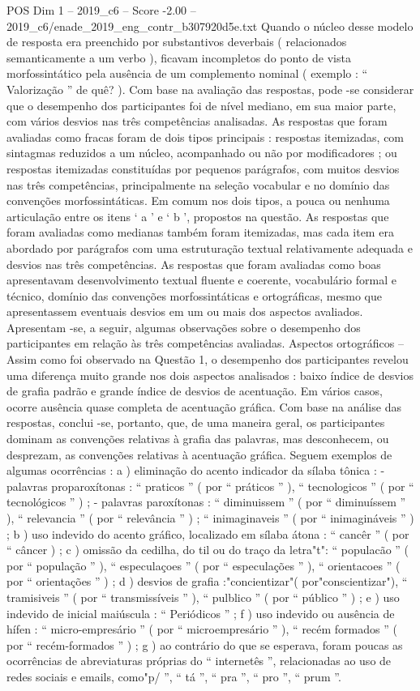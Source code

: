 \begin{textsample}{POS Dim 1 – 2019\_c6 – Score -2.00 – 2019\_c6/enade\_2019\_eng\_contr\_b307920d5e.txt}
Quando o núcleo desse modelo de resposta era preenchido por substantivos deverbais ( relacionados semanticamente a um verbo ), ficavam incompletos do ponto de vista morfossintático pela ausência de um complemento nominal ( exemplo : “ Valorização ” de quê? ).
Com base na avaliação das respostas, pode -se considerar que o desempenho dos participantes foi de nível mediano, em sua maior parte, com vários desvios nas três competências analisadas.
As respostas que foram avaliadas como fracas foram de dois tipos principais : respostas itemizadas, com sintagmas reduzidos a um núcleo, acompanhado ou não por modificadores ; ou respostas itemizadas constituídas por pequenos parágrafos, com muitos desvios nas três competências, principalmente na seleção vocabular e no domínio das convenções morfossintáticas.
Em comum nos dois tipos, a pouca ou nenhuma articulação entre os itens ‘ a ’ e ‘ b ’, propostos na questão.
As respostas que foram avaliadas como medianas também foram itemizadas, mas cada item era abordado por parágrafos com uma estruturação textual relativamente adequada e desvios nas três competências.
As respostas que foram avaliadas como boas apresentavam desenvolvimento textual fluente e coerente, vocabulário formal e técnico, domínio das convenções morfossintáticas e ortográficas, mesmo que apresentassem eventuais desvios em um ou mais dos aspectos avaliados.
Apresentam -se, a seguir, algumas observações sobre o desempenho dos participantes em relação às três competências avaliadas.
Aspectos ortográficos – Assim como foi observado na Questão 1, o desempenho dos participantes revelou uma diferença muito grande nos dois aspectos analisados : baixo índice de desvios de grafia padrão e grande índice de desvios de acentuação.
Em vários casos, ocorre ausência quase completa de acentuação gráfica.
Com base na análise das respostas, conclui -se, portanto, que, de uma maneira geral, os participantes dominam as convenções relativas à grafia das palavras, mas desconhecem, ou desprezam, as convenções relativas à acentuação gráfica.
Seguem exemplos de algumas ocorrências : a ) eliminação do acento indicador da sílaba tônica : - palavras proparoxítonas : “ praticos ” ( por “ práticos ” ), “ tecnologicos ” ( por “ tecnológicos ” ) ; - palavras paroxítonas : “ diminuissem ” ( por “ diminuíssem ” ), “ relevancia ” ( por “ relevância ” ) ; “ inimaginaveis ” ( por “ inimagináveis ” ) ; b ) uso indevido do acento gráfico, localizado em sílaba átona : “ cancêr ” ( por “ câncer ) ; c ) omissão da cedilha, do til ou do traço da letra"t": “ populacão ” ( por “ população ” ), “ especulaçoes ” ( por “ especulações ” ), “ orientacoes ” ( por “ orientações ” ) ; d ) desvios de grafia :"concientizar"( por"conscientizar"), “ tramisiveis ” ( por “ transmissíveis ” ), “ pulblico ” ( por “ público ” ) ; e ) uso indevido de inicial maiúscula : “ Periódicos ” ; f ) uso indevido ou ausência de hífen : “ micro-empresário ” ( por “ microempresário ” ), “ recém formados ” ( por “ recém-formados ” ) ; g ) ao contrário do que se esperava, foram poucas as ocorrências de abreviaturas próprias do “ internetês ”, relacionadas ao uso de redes sociais e emails, como"p/ ”, “ tá ”, “ pra ”, “ pro ”, “ prum ”.

\end{textsample}
